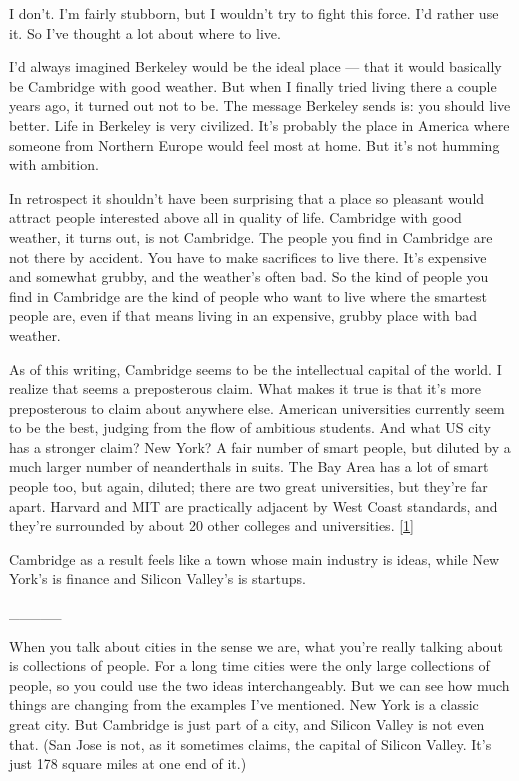 I don't. I'm fairly stubborn, but I wouldn't try to fight this force.
I'd rather use it. So I've thought a lot about where to live.

I'd always imagined Berkeley would be the ideal place --- that it would
basically be Cambridge with good weather. But when I finally tried
living there a couple years ago, it turned out not to be. The message
Berkeley sends is: you should live better. Life in Berkeley is very
civilized. It's probably the place in America where someone from
Northern Europe would feel most at home. But it's not humming with
ambition.

In retrospect it shouldn't have been surprising that a place so pleasant
would attract people interested above all in quality of life. Cambridge
with good weather, it turns out, is not Cambridge. The people you find
in Cambridge are not there by accident. You have to make sacrifices to
live there. It's expensive and somewhat grubby, and the weather's often
bad. So the kind of people you find in Cambridge are the kind of people
who want to live where the smartest people are, even if that means
living in an expensive, grubby place with bad weather.

As of this writing, Cambridge seems to be the intellectual capital of
the world. I realize that seems a preposterous claim. What makes it true
is that it's more preposterous to claim about anywhere else. American
universities currently seem to be the best, judging from the flow of
ambitious students. And what US city has a stronger claim? New York? A
fair number of smart people, but diluted by a much larger number of
neanderthals in suits. The Bay Area has a lot of smart people too, but
again, diluted; there are two great universities, but they're far apart.
Harvard and MIT are practically adjacent by West Coast standards, and
they're surrounded by about 20 other colleges and universities.
{[}\hyperref[f1n]{1}{]}

Cambridge as a result feels like a town whose main industry is ideas,
while New York's is finance and Silicon Valley's is startups.

\_\_\_\_\_

When you talk about cities in the sense we are, what you're really
talking about is collections of people. For a long time cities were the
only large collections of people, so you could use the two ideas
interchangeably. But we can see how much things are changing from the
examples I've mentioned. New York is a classic great city. But Cambridge
is just part of a city, and Silicon Valley is not even that. (San Jose
is not, as it sometimes claims, the capital of Silicon Valley. It's just
178 square miles at one end of it.)

